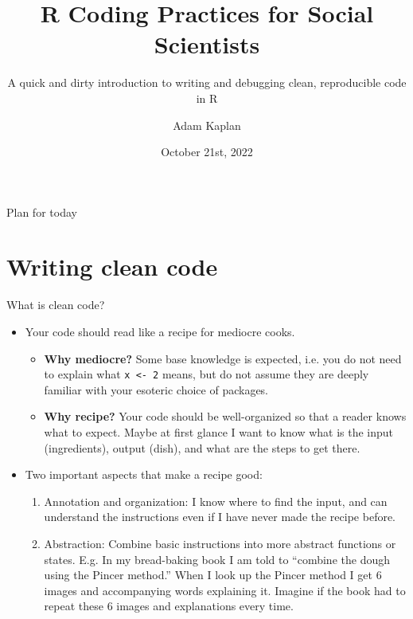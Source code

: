 \documentclass[aspectratio=169,xcolor=dvipsnames]{beamer}
\title[]{R Coding Practices for Social Scientists}
\subtitle{A quick and dirty introduction to writing and debugging clean, reproducible code in R}
\author[]{\large{Adam Kaplan}}
\institute[]{Massachusetts Institute of Technology}
\date[]{October 21st, 2022}
\begin{document}
\begin{frame}
    \titlepage
\end{frame}

\begin{frame}{Plan for today}
		\tableofcontents
	\end{frame}


\section{Writing clean code}

\begin{frame}[t]{What is clean code?}
  \begin{itemize}
    \item Your code should read like a recipe for mediocre cooks.\pause
    \begin{itemize}
      \item \textbf{Why mediocre?} \pause Some base knowledge is expected, i.e. you do not need to explain what \texttt{x <- 2} means, but do not assume they are deeply familiar with your esoteric choice of packages. \pause
      \item \textbf{Why recipe?} \pause Your code should be well-organized so that a reader knows what to expect. Maybe at first glance I want to know what is the input (ingredients), output (dish), and what are the steps to get there.
    \end{itemize}\pause
    \item Two important aspects that make a recipe good:\pause
    \begin{enumerate}
      \item \alert{Annotation and organization:} I know where to find the input, and can understand the instructions even if I have never made the recipe before.\pause
      \item \alert{Abstraction:} Combine basic instructions into more abstract functions or states. E.g. In my bread-baking book I am told to ``combine the dough using the Pincer method.'' When I look up the Pincer method I get 6 images and accompanying words explaining it. Imagine if the book had to repeat these 6 images and explanations every time.
    \end{enumerate}
  \end{itemize}
\end{frame}
\end{document}
